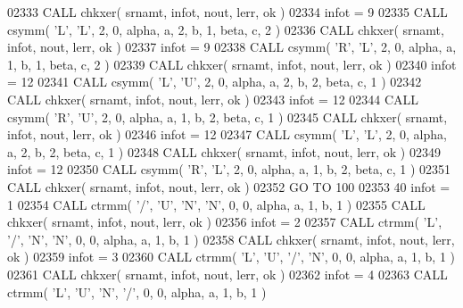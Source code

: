 \begin{DoxyCode}
02333       \textcolor{keyword}{CALL }chkxer( srnamt, infot, nout, lerr, ok )
02334       infot = 9
02335       \textcolor{keyword}{CALL }csymm( \textcolor{stringliteral}{'L'}, \textcolor{stringliteral}{'L'}, 2, 0, alpha, a, 2, b, 1, beta, c, 2 )
02336       \textcolor{keyword}{CALL }chkxer( srnamt, infot, nout, lerr, ok )
02337       infot = 9
02338       \textcolor{keyword}{CALL }csymm( \textcolor{stringliteral}{'R'}, \textcolor{stringliteral}{'L'}, 2, 0, alpha, a, 1, b, 1, beta, c, 2 )
02339       \textcolor{keyword}{CALL }chkxer( srnamt, infot, nout, lerr, ok )
02340       infot = 12
02341       \textcolor{keyword}{CALL }csymm( \textcolor{stringliteral}{'L'}, \textcolor{stringliteral}{'U'}, 2, 0, alpha, a, 2, b, 2, beta, c, 1 )
02342       \textcolor{keyword}{CALL }chkxer( srnamt, infot, nout, lerr, ok )
02343       infot = 12
02344       \textcolor{keyword}{CALL }csymm( \textcolor{stringliteral}{'R'}, \textcolor{stringliteral}{'U'}, 2, 0, alpha, a, 1, b, 2, beta, c, 1 )
02345       \textcolor{keyword}{CALL }chkxer( srnamt, infot, nout, lerr, ok )
02346       infot = 12
02347       \textcolor{keyword}{CALL }csymm( \textcolor{stringliteral}{'L'}, \textcolor{stringliteral}{'L'}, 2, 0, alpha, a, 2, b, 2, beta, c, 1 )
02348       \textcolor{keyword}{CALL }chkxer( srnamt, infot, nout, lerr, ok )
02349       infot = 12
02350       \textcolor{keyword}{CALL }csymm( \textcolor{stringliteral}{'R'}, \textcolor{stringliteral}{'L'}, 2, 0, alpha, a, 1, b, 2, beta, c, 1 )
02351       \textcolor{keyword}{CALL }chkxer( srnamt, infot, nout, lerr, ok )
02352       \textcolor{keywordflow}{GO TO} 100
02353    40 infot = 1
02354       \textcolor{keyword}{CALL }ctrmm( \textcolor{stringliteral}{'/'}, \textcolor{stringliteral}{'U'}, \textcolor{stringliteral}{'N'}, \textcolor{stringliteral}{'N'}, 0, 0, alpha, a, 1, b, 1 )
02355       \textcolor{keyword}{CALL }chkxer( srnamt, infot, nout, lerr, ok )
02356       infot = 2
02357       \textcolor{keyword}{CALL }ctrmm( \textcolor{stringliteral}{'L'}, \textcolor{stringliteral}{'/'}, \textcolor{stringliteral}{'N'}, \textcolor{stringliteral}{'N'}, 0, 0, alpha, a, 1, b, 1 )
02358       \textcolor{keyword}{CALL }chkxer( srnamt, infot, nout, lerr, ok )
02359       infot = 3
02360       \textcolor{keyword}{CALL }ctrmm( \textcolor{stringliteral}{'L'}, \textcolor{stringliteral}{'U'}, \textcolor{stringliteral}{'/'}, \textcolor{stringliteral}{'N'}, 0, 0, alpha, a, 1, b, 1 )
02361       \textcolor{keyword}{CALL }chkxer( srnamt, infot, nout, lerr, ok )
02362       infot = 4
02363       \textcolor{keyword}{CALL }ctrmm( \textcolor{stringliteral}{'L'}, \textcolor{stringliteral}{'U'}, \textcolor{stringliteral}{'N'}, \textcolor{stringliteral}{'/'}, 0, 0, alpha, a, 1, b, 1 )

\end{DoxyCode}
